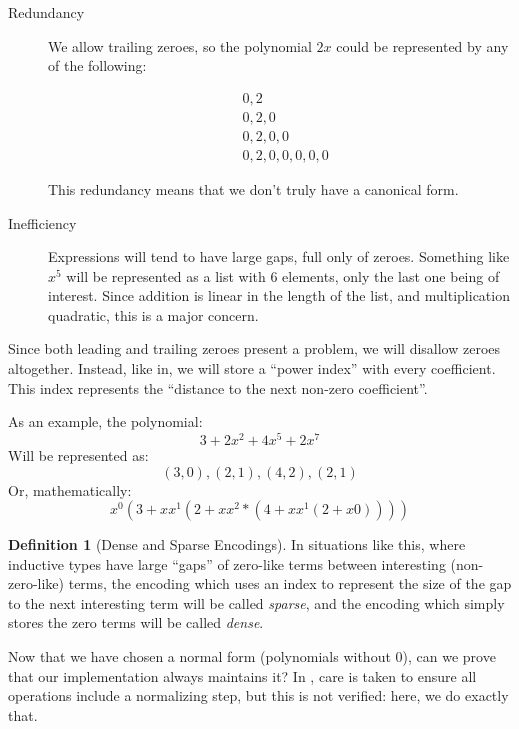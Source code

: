 \documentclass[draft, twocolumn]{article}
\theoremstyle{definition}
\newtheorem{definition}{Definition}[section]
\theoremstyle{definition}
\begin{document}
\begin{description}
  \item[Redundancy] We allow trailing zeroes, so the polynomial $2x$ could be
    represented by any of the following:
  
    \begin{align*}
      & 0, 2 \\
      & 0, 2, 0 \\
      & 0, 2, 0, 0 \\
      & 0, 2, 0, 0, 0, 0, 0
    \end{align*}
    
    This redundancy means that we don't truly have a canonical form.
  \item[Inefficiency] Expressions will tend to have large gaps, full only of
    zeroes. Something like $x^5$ will be represented as a list with 6 elements,
    only the last one being of interest. Since addition is linear in the length
    of the list, and multiplication quadratic, this is a major concern.
\end{description}
Since both leading and trailing zeroes present a problem, we will disallow
zeroes altogether. Instead, like in\cite{gregoire_proving_2005}, we will store a
``power index'' with every coefficient\footnotemark. This index represents the
``distance to the next non-zero coefficient''.

As an example, the polynomial:
\[ 3 + 2x^2 + 4x^5 + 2x^7 \]
Will be represented as:
\[ (3,0),(2,1),(4,2),(2,1) \]
Or, mathematically:
\[ x^0 (3 + x x^1 (2 + x x^2 * (4 + x x^1 (2 + x 0)))) \]

\begin{definition}[Dense and Sparse Encodings]
  In situations like this, where inductive types have large ``gaps'' of
  zero-like terms between interesting (non-zero-like) terms, the encoding which
  uses an index to represent the size of the gap to the next interesting term
  will be called \emph{sparse}, and the encoding which simply stores the zero
  terms will be called \emph{dense}.
\end{definition}

Now that we have chosen a normal form (polynomials without 0), can we prove that
our implementation always maintains it? In \cite{gregoire_proving_2005}, care
is taken to ensure all operations include a normalizing step, but this is not
verified: here, we do exactly that.
\end{document}
